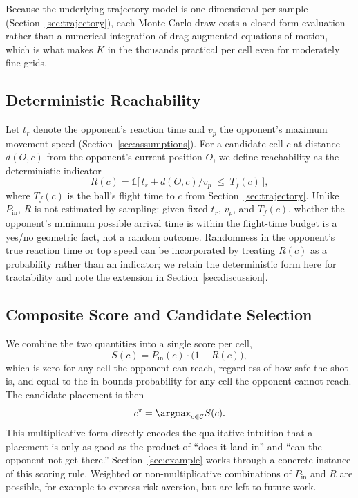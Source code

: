   Because the underlying trajectory model is one-dimensional per sample
  (Section~\ref{sec:trajectory}), each Monte Carlo draw costs a closed-form
  evaluation rather than a numerical integration of drag-augmented equations of
  motion, which is what makes $K$ in the thousands practical per cell even for
  moderately fine grids.

  \subsection{Deterministic Reachability}\label{sec:reach}

  Let $t_r$ denote the opponent's reaction time and $v_p$ the opponent's maximum
  movement speed (Section~\ref{sec:assumptions}). For a candidate cell $c$ at
  distance $d(O, c)$ from the opponent's current position $O$, we define
  reachability as the deterministic indicator
  \begin{equation}
  R(c) = \mathbb{1}\big[\, t_r + d(O,c)/v_p \; \le \; T_f(c) \,\big] ,
  \end{equation}
  where $T_f(c)$ is the ball's flight time to $c$ from
  Section~\ref{sec:trajectory}. Unlike $P_{\mathrm{in}}$, $R$ is not estimated
  by sampling: given fixed $t_r$, $v_p$, and $T_f(c)$, whether the opponent's
  minimum possible arrival time is within the flight-time budget is a yes/no
  geometric fact, not a random outcome. Randomness in the opponent's true
  reaction time or top speed can be incorporated by treating $R(c)$ as a
  probability rather than an indicator; we retain the deterministic form here
  for tractability and note the extension in Section~\ref{sec:discussion}.

  \subsection{Composite Score and Candidate Selection}\label{sec:score}

  We combine the two quantities into a single score per cell,
  \begin{equation}
  S(c) = P_{\mathrm{in}}(c) \cdot \big(1 - R(c)\big) ,
  \end{equation}
  which is zero for any cell the opponent can reach, regardless of how safe the
  shot is, and equal to the in-bounds probability for any cell the opponent
  cannot reach. The candidate placement is then
  \begin{equation}
  c^\star = \argmax_{c \in \mathcal{C}} S(c) .
  \end{equation}
  This multiplicative form directly encodes the qualitative intuition that a
  placement is only as good as the product of ``does it land in'' and ``can the
  opponent not get there.'' Section~\ref{sec:example} works through a concrete
  instance of this scoring rule. Weighted or non-multiplicative combinations of
  $P_{\mathrm{in}}$ and $R$ are possible, for example to express risk
  aversion, but are left to future work.

